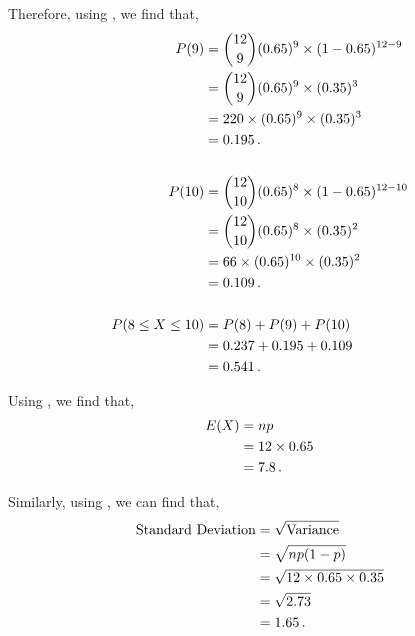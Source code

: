\begin{subquestions}
\begin{subsubquestions}
\begin{subsubsubquestions}
Therefore, using , we find that,
\begin{align}
	P(9) & = { 12 \choose 9} (0.65)^9 \times (1-0.65)^{12-9} \nonumber \\
	     & = { 12 \choose 9} (0.65)^9 \times (0.35)^{3} \nonumber \\
	     & = 220 \times (0.65)^9 \times (0.35)^{3} \nonumber \\
	     & = 0.195 \,. \\ \nonumber \\
	P(10) & = { 12 \choose 10} (0.65)^8 \times (1-0.65)^{12-10} \nonumber \\
         & = { 12 \choose 10} (0.65)^8 \times (0.35)^{2} \nonumber \\
	     & = 66 \times (0.65)^{10} \times (0.35)^{2} \nonumber \\
	     & = 0.109 \,. \\ \nonumber \\
	P(8\leq X \leq 10) & = P(8)+P(9)+P(10) \nonumber \\
	                   & = 0.237+0.195+0.109 \nonumber \\
	                   & = 0.541 \,.   
\end{align}

\end{subsubsubquestions}


\subsubquestion

Using , we find that,
\begin{align}
	E(X) & = np \nonumber \\
	     & = 12 \times 0.65 \nonumber \\
	     & = 7.8 \,.
\end{align}

Similarly, using , we can find that,
\begin{align}
	\text{Standard Deviation} & = \sqrt{\text{Variance}} \nonumber \\
	                          & = \sqrt{np(1-p)} \nonumber \\
	                          & = \sqrt{12\times0.65\times0.35} \nonumber \\
	                          & = \sqrt{2.73} \nonumber \\
	                          & = 1.65 \,.
\end{align}



\end{subsubquestions}
\end{subquestions}
